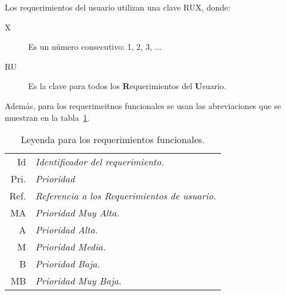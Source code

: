 	Los requerimientos del usuario utilizan una clave RUX, donde:
	
\begin{description}
	\item[X] Es un número consecutivo: 1, 2, 3, ...
	\item[RU] Es la clave para todos los {\bf R}equerimientos del {\bf U}suario.
\end{description}

	Además, para los requerimeitnos funcionales se usan las abreviaciones que se muestran en la tabla~\ref{tbl:leyendaRF}.
\begin{table}[hbtp!]
	\begin{center}
    \begin{tabular}{|r l|}
	    \hline
    	{\footnotesize Id} & {\footnotesize\em Identificador del requerimiento.}\\
    	{\footnotesize Pri.} & {\footnotesize\em Prioridad}\\
    	{\footnotesize Ref.} & {\footnotesize\em Referencia a los Requerimientos de usuario.}\\
    	{\footnotesize MA} & {\footnotesize\em Prioridad Muy Alta.}\\
    	{\footnotesize A} & {\footnotesize\em Prioridad Alta.}\\
    	{\footnotesize M} & {\footnotesize\em Prioridad Media.}\\
    	{\footnotesize B} & {\footnotesize\em Prioridad Baja.}\\
    	{\footnotesize MB} & {\footnotesize\em Prioridad Muy Baja.}\\
		\hline
    \end{tabular} 
    \caption{Leyenda para los requerimientos funcionales.}
    \label{tbl:leyendaRF}
	\end{center}
\end{table}